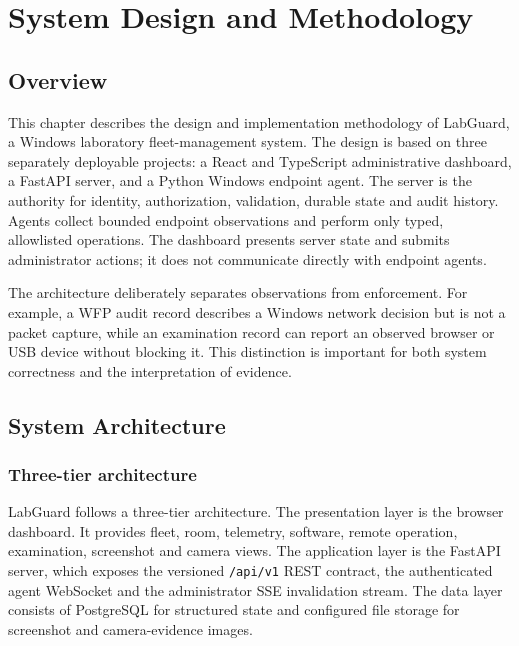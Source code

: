 \documentclass[12pt,a4paper]{report}
\begin{document}
\chapter{System Design and Methodology}

\section{Overview}
This chapter describes the design and implementation methodology of LabGuard, a
Windows laboratory fleet-management system. The design is based on three
separately deployable projects: a React and TypeScript administrative dashboard,
a FastAPI server, and a Python Windows endpoint agent. The server is the
authority for identity, authorization, validation, durable state and audit
history. Agents collect bounded endpoint observations and perform only typed,
allowlisted operations. The dashboard presents server state and submits
administrator actions; it does not communicate directly with endpoint agents.

The architecture deliberately separates observations from enforcement. For
example, a WFP audit record describes a Windows network decision but is not a
packet capture, while an examination record can report an observed browser or
USB device without blocking it. This distinction is important for both system
correctness and the interpretation of evidence.

\section{System Architecture}

\subsection{Three-tier architecture}
LabGuard follows a three-tier architecture. The presentation layer is the
browser dashboard. It provides fleet, room, telemetry, software, remote
operation, examination, screenshot and camera views. The application layer is
the FastAPI server, which exposes the versioned \texttt{/api/v1} REST contract,
the authenticated agent WebSocket and the administrator SSE invalidation
stream. The data layer consists of PostgreSQL for structured state and
configured file storage for screenshot and camera-evidence images.
\end{document}
